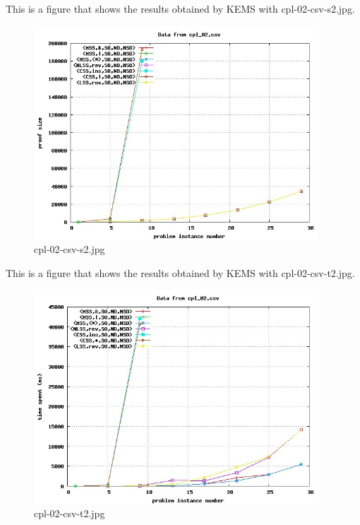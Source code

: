 This is a figure that shows the results obtained by KEMS with cpl-02-csv-s2.jpg.
\begin{figure}[htbp]
\begin{center}
\includegraphics[width=0.95\textwidth]{figuras/cpl-02-csv-s2.jpg}
\end{center}
\caption{cpl-02-csv-s2.jpg}
\end{figure}

This is a figure that shows the results obtained by KEMS with cpl-02-csv-t2.jpg.
\begin{figure}[htbp]
\begin{center}
\includegraphics[width=0.95\textwidth]{figuras/cpl-02-csv-t2.jpg}
\end{center}
\caption{cpl-02-csv-t2.jpg}
\end{figure}

